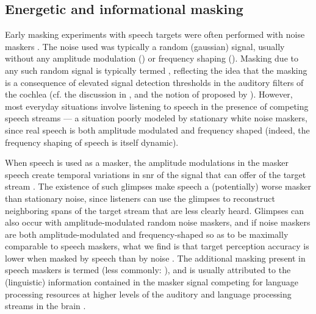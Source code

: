 \subsection{Energetic and informational masking\label{sec:InfoMasking}}
Early masking experiments with speech targets were often performed with noise maskers \citep[\eg][]{HawkinsStevens1950,Tolhurst1957b,PollackPickett1958}.  The noise used was typically a random (gaussian) signal, usually without any amplitude modulation () or frequency shaping ().  Masking due to any such random signal is typically termed , reflecting the idea that the masking is a consequence of elevated signal detection thresholds in the auditory filters of the cochlea (cf. the discussion in \citealt[96–97]{Moore2008}, and the notion of  proposed by \citealt{DurlachEtAl2003a}).  However, most everyday situations involve listening to speech in the presence of competing speech streams — a situation poorly modeled by stationary white noise maskers, since real speech is both amplitude modulated and frequency shaped (indeed, the frequency shaping of speech is itself dynamic).

\label{par:Glimpsing}When speech is used as a masker, the amplitude modulations in the masker speech create temporal variations in \ac{snr} of the signal that can offer  of the target stream \citep{FestenPlomp1990}.  The existence of such glimpses make speech a (potentially) worse masker than stationary noise, since listeners can use the glimpses to reconstruct neighboring spans of the target stream that are less clearly heard.\footnotemark{}  Glimpses can also occur with amplitude-modulated random noise maskers, and if noise maskers are both amplitude-modulated and frequency-shaped so as to be maximally comparable to speech maskers, what we find is that target perception accuracy is lower when masked by speech than by noise \citep[\eg][]{CarhartEtAl1969,LewisEtAl1988,SimpsonCooke2005}.  The additional masking present in speech maskers is termed  (less commonly: ), and is usually attributed to the (linguistic) information contained in the masker signal competing for language processing resources at higher levels of the auditory and language processing streams in the brain \citep{DurlachEtAl2003a,xxx}.

